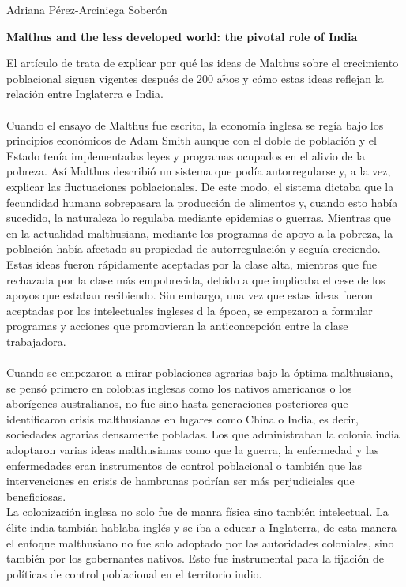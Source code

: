 \documentclass[11pt,spanish,letterpaper]{article}
\theoremstyle{plain}
\begin{document}
\begin{flushleft}
Adriana P\'erez-Arciniega Sober\'on
\end{flushleft}
\begin{center}
\textbf{Malthus and the less developed world: the pivotal role of India}
\end{center}
El art\'iculo de \cite{caldwell1998malthus} trata de explicar por qu\'e las ideas de Malthus sobre el crecimiento poblacional siguen vigentes despu\'es de 200 a$\tilde{n}$os y c\'omo estas ideas reflejan la relaci\'on entre Inglaterra e India.\\
\\
Cuando el ensayo de Malthus fue escrito, la econom\'ia inglesa se reg\'ia bajo los principios econ\'omicos de Adam Smith aunque con el doble de poblaci\'on y el Estado ten\'ia implementadas leyes y programas ocupados en el alivio de la pobreza. As\'i Malthus describi\'o un sistema que pod\'ia autorregularse y, a la vez, explicar las fluctuaciones poblacionales. De este modo, el sistema dictaba que la fecundidad humana sobrepasara la producci\'on de alimentos y, cuando esto hab\'ia sucedido, la naturaleza lo regulaba mediante epidemias o guerras. Mientras que en la actualidad malthusiana, mediante los programas de apoyo a la pobreza, la poblaci\'on hab\'ia afectado su propiedad de autorregulaci\'on y segu\'ia creciendo. Estas ideas fueron r\'apidamente aceptadas por la clase alta, mientras que fue rechazada por la clase m\'as empobrecida, debido a que implicaba el cese de los apoyos que estaban recibiendo. Sin embargo, una vez que estas ideas fueron aceptadas por los intelectuales ingleses d la \'epoca, se empezaron a formular programas y acciones que promovieran la anticoncepci\'on entre la clase trabajadora.\\
\\
Cuando se empezaron a mirar poblaciones agrarias bajo la \'optima malthusiana, se pens\'o primero en colobias inglesas como los nativos americanos o los abor\'igenes australianos, no fue sino hasta generaciones posteriores que identificaron crisis malthusianas en lugares como China o India, es decir, sociedades agrarias densamente pobladas. Los que administraban la colonia india adoptaron varias ideas malthusianas como que la guerra, la enfermedad y las enfermedades eran instrumentos de control poblacional o tambi\'en que las intervenciones en crisis de hambrunas podr\'ian ser m\'as perjudiciales que beneficiosas.\'
\\

La colonizaci\'on inglesa no solo fue de manra f\'isica sino tambi\'en intelectual. La \'elite india tambi\'an hablaba ingl\'es y se iba a educar a Inglaterra, de esta manera el enfoque malthusiano no fue solo adoptado por las autoridades coloniales, sino tambi\'en por los gobernantes nativos. Esto fue instrumental para la fijaci\'on de pol\'iticas de control poblacional en el territorio indio. 


\end{document}
